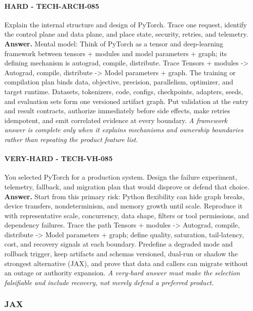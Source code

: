 \paragraph{HARD - TECH-ARCH-085} Explain the internal structure and design of PyTorch. Trace one request, identify the control plane and data plane, and place state, security, retries, and telemetry.
\textbf{Answer.} Mental model: Think of PyTorch as a tensor and deep-learning framework between tensors + modules and model parameters + graph; its defining mechanism is autograd, compile, distribute. Trace Tensors + modules -> Autograd, compile, distribute -> Model parameters + graph. The training or compilation plan binds data, objective, precision, parallelism, optimizer, and target runtime. Datasets, tokenizers, code, configs, checkpoints, adapters, seeds, and evaluation sets form one versioned artifact graph. Put validation at the entry and result contracts, authorize immediately before side effects, make retries idempotent, and emit correlated evidence at every boundary.
\textit{A framework answer is complete only when it explains mechanisms and ownership boundaries rather than repeating the product feature list.}
\paragraph{VERY-HARD - TECH-VH-085} You selected PyTorch for a production system. Design the failure experiment, telemetry, fallback, and migration plan that would disprove or defend that choice.
\textbf{Answer.} Start from this primary risk: Python flexibility can hide graph breaks, device transfers, nondeterminism, and memory growth until scale. Reproduce it with representative scale, concurrency, data shape, filters or tool permissions, and dependency failures. Trace the path Tensors + modules -> Autograd, compile, distribute -> Model parameters + graph; define quality, saturation, tail-latency, cost, and recovery signals at each boundary. Predefine a degraded mode and rollback trigger, keep artifacts and schemas versioned, dual-run or shadow the strongest alternative (JAX), and prove that data and callers can migrate without an outage or authority expansion.
\textit{A very-hard answer must make the selection falsifiable and include recovery, not merely defend a preferred product.}
\subsubsection*{JAX}
